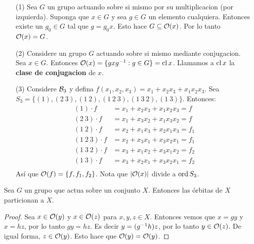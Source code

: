 \begin{example}\label{}
    \begin{enumerate}
        \item[(1)] Sea $G$ un grupo actuando sobre si mismo por su
            multiplicacion  (por izquierda). Suponga que $x \in G$ y sea  $g \in
            G$ un elemento cualquiera. Entonces existe un  $g_0 \in G$ tal que
            $g=g_0x$. Esto hace $G \subseteq \mathcal{O}(x)$. Por lo tanto $\mathcal{O}(x)=G$.

        \item[(2)] Considere un grupo $G$ actuando sobre si mismo mediante
            conjugacion. Sea $x \in G$. Entonces $\mathcal{O}(x)=\{gxg^{-1} : g \in
            G\}=\operatorname{cl}{x}$. Llamamos a $\operatorname{cl}{x}$ la \textbf{clase de conjugacion} de
            $x$.

        \item[(3)] Considere $\mathcal{B}_3$ y defina
            $f(x_1,x_2,x_3)=x_1+x_2x_3+x_1x_2x_3$. Sea $S_3=\{(1), (2 \ 3), (1 \
            2), (1 \ 2 \ 3), (1 \ 3 \ 2), (1 \ 3)\}$. Entonces:
            \begin{align*}
                (1) \cdot f     &=  x_1+x_2x_3+x_1x_2x_3=f  \\
                (2 \ 3) \cdot f         &= x_1+x_3x_2+x_1x_3x_2=f    \\
                (1 \ 2) \cdot f     &= x_2+x_1x_3+x_2x_1x_3=f_1     \\
                (1 \ 2 \ 3) \cdot f     &=  x_2+x_3x_1+x_3x_2x_1=f_1    \\
                (1 \ 3 \ 2) \cdot f     &=  x_3+x_1x_2+x_3x_1x_2=f_2    \\
                (1 \ 3) \cdot f     &=  x_3+x_2x_1+x_3x_2x_1=f_2    \\
            \end{align*}
            As\'i que $\mathcal{O}(f)=\{f,f_1,f_2\}$. Nota que $|\mathcal{O}(x)|$ divide a
            $\operatorname{ord}{S_3}$.
    \end{enumerate}
\end{example}

\begin{lemma}\label{}
    Sea $G$ un grupo que actua sobre un conjunto  $X$. Entonces las \'orbitas de
     $X$ particionan a  $X$.
\end{lemma}
\begin{proof}
    Sea $x \in \mathcal{O}(y)$ y $x \in \mathcal{O}(z)$ para $x,y,z \in X$. Entonces vemos que
    $x=gy$ y  $x=hz$, por lo tanto  $gy=hz$. Es decir  $y=(g^{-1}h)z$, por lo
    tanto $y \in \mathcal{O}(z)$. De igual forma, $z \in \mathcal{O}(y)$. Esto hace que
    $\mathcal{O}(y)=\mathcal{O}(y)$.
\end{proof}

